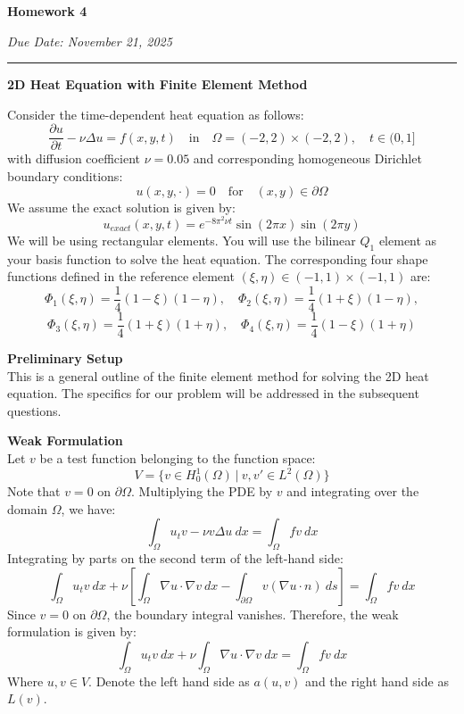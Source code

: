\documentclass[12pt]{article}
\newcounter{question}
\begin{document}
\begin{center}
\textbf{\huge Homework 4}

{\large\emph{Due Date: November 21, 2025}}
\vspace{1em}
\end{center}
\hrule

\vspace{1em}
\textbf{\Large 2D Heat Equation with Finite Element Method}

Consider the time-dependent heat equation as follows:
\[\frac{\partial u}{\partial t} - \nu \Delta u = f(x,y,t) \quad \text{in} \quad \Omega = (-2,2) \times (-2,2), \quad t \in (0,1]\]
with diffusion coefficient $\nu = 0.05$ and corresponding homogeneous Dirichlet boundary conditions:
\[u(x,y,\cdot) = 0 \quad \text{for} \quad (x,y) \in \partial \Omega\]
We assume the exact solution is given by:
\[u_{exact}(x,y,t) = e^{-8\pi^2 \nu t} \sin(2\pi x) \sin(2\pi y)\]
We will be using rectangular elements. You will use the bilinear $Q_1$ element as your basis function to solve the heat equation. The corresponding four shape functions defined in the reference element $(\xi,\eta) \in (-1,1) \times (-1,1)$ are:
\[\Phi_1(\xi,\eta) = \frac{1}{4}(1-\xi)(1-\eta), \quad \Phi_2(\xi,\eta) = \frac{1}{4}(1+\xi)(1-\eta),\]
\[\Phi_3(\xi,\eta) = \frac{1}{4}(1+\xi)(1+\eta), \quad \Phi_4(\xi,\eta) = \frac{1}{4}(1-\xi)(1+\eta)\]

\newpage
{\Large \textbf{Preliminary Setup}}\\
This is a general outline of the finite element method for solving the 2D heat equation. The specifics for our problem will be addressed in the subsequent questions.

\vspace{1em}
{\large \textbf{Weak Formulation}} \\
Let $v$ be a test function belonging to the function space:
\[V = \{v \in H^1_0(\Omega) \ | \ v, v' \in L^2(\Omega)\}\]
Note that $v=0$ on $\partial \Omega$. Multiplying the PDE by $v$ and integrating over the domain $\Omega$, we have:
\[\int_{\Omega} u_t v - \nu v \Delta u \ dx = \int_{\Omega} f v \ dx\]
Integrating by parts on the second term of the left-hand side:
\[\int_{\Omega} u_t v \ dx + \nu [\int_{\Omega} \nabla u \cdot \nabla v \ dx - \int_{\partial \Omega} v (\nabla u \cdot n) \ ds] = \int_{\Omega} f v \ dx\]
Since $v=0$ on $\partial \Omega$, the boundary integral vanishes. Therefore, the weak formulation is given by:
\[\int_{\Omega} u_t v \ dx + \nu \int_{\Omega} \nabla u \cdot \nabla v \ dx = \int_{\Omega} f v \ dx\]
Where $u,v \in V$. Denote the left hand side as $a(u,v)$ and the right hand side as $L(v)$.
\end{document}
